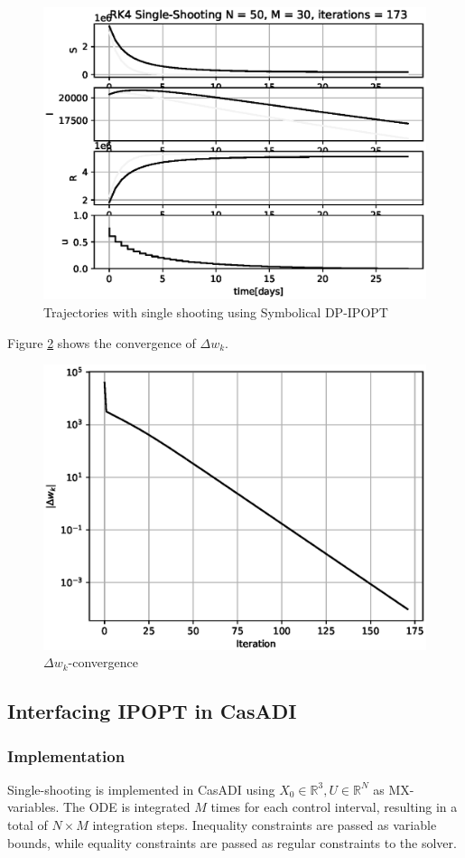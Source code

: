 \begin{figure}[H]
    \centering
    \includegraphics[width=.8\textwidth]{pythonProject/Figures/Symbolic_IPOPT_Traj.eps}
    \caption{Trajectories with single shooting using Symbolical DP-IPOPT}
    \label{fig:Symbolical_DPIPOPT_traj_Vaccine}
\end{figure}
Figure \ref{fig:Delta_wk_convergence_Vaccine} shows the convergence of $\Delta w_k$.

\begin{figure}[H]
    \centering
    \includegraphics[width=.8\textwidth]{pythonProject/Figures/Symbolic_IPOPT_error.eps}
    \caption{$\Delta w_k$-convergence}
    \label{fig:Delta_wk_convergence_Vaccine}
\end{figure}


\subsection{Interfacing IPOPT in CasADI}
\subsubsection{Implementation}
Single-shooting is implemented in CasADI using $X_0 \in \mathbb{R}^3, U \in \mathbb{R}^{N}$ as MX-variables. The ODE is integrated $M$ times for each control interval, resulting in a total of $N\times M$ integration steps. Inequality constraints are passed as variable bounds, while equality constraints are passed as regular constraints to the solver.

